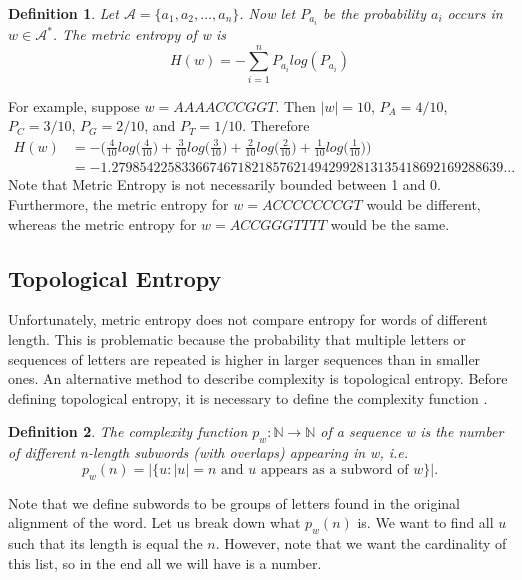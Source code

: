 \documentclass{article}
\newtheorem{definition}{Definition}
\begin{document}
\begin{definition}
    Let $\mathcal{A} = \{a_1, a_2, \dots, a_n\}$. Now let $P_{a_i}$ be the probability $a_i$ occurs in $w \in \mathcal{A}^*$.
    The metric entropy of w is 
    \begin{equation*}
        H(w) = -\sum^n_{i=1} P_{a_i} log(P_{a_i})
    \end{equation*}
\end{definition}

For example, suppose $w = AAAACCCGGT$.
Then $|w| = 10$, $P_A = 4/10$, $P_C = 3/10$, $P_G = 2/10$, and $P_T = 1/10$. 
Therefore 
\begin{align*}
    H(w) &= -\bigg(\frac{4}{10}log\bigg(\frac{4}{10}\bigg) + \frac{3}{10}log\bigg(\frac{3}{10}\bigg) + \frac{2}{10}log\bigg(\frac{2}{10}\bigg) + \frac{1}{10}log\bigg(\frac{1}{10}\bigg)\bigg) \\
    &= -1.27985422583366746718218576214942992813135418692169288639...
\end{align*}
\noindent Note that Metric Entropy is not necessarily bounded between 1 and 0. 
Furthermore, the metric entropy for $w = ACCCCCCCGT$ would be different, whereas the metric entropy for $w = ACCGGGTTTT$ would be the same.

\subsection{Topological Entropy}
Unfortunately, metric entropy does not compare entropy for words of different length.
This is problematic because the probability that multiple letters or sequences of letters are repeated is higher in larger sequences than in smaller ones.
An alternative method to describe complexity is topological entropy.
Before defining topological entropy, it is necessary to define the complexity function \cite{1}.

\begin{definition}
    The complexity function $p_w : \mathbb{N} \rightarrow \mathbb{N}$ of a sequence w is the number of different n-length subwords (with overlaps) appearing in w, i.e.
    \begin{equation*}
        p_w(n) = |\{u:|u| = \text{$n$ and $u$ appears as a subword of $w$}\}|.
    \end{equation*}
\end{definition}
\noindent Note that we define subwords to be groups of letters found in the original alignment of the word.
Let us break down what $p_w(n)$ is.
We want to find all $u$ such that its length is equal the $n$.
However, note that we want the cardinality of this list, so in the end all we will have is a number.
\end{document}
